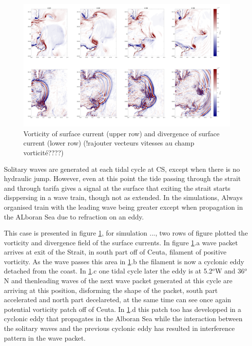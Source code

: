 \begin{figure}[!h]
 \centering
\includegraphics[width=\linewidth]{./GBR3D/FigTourbVE2.png}
 \caption {Vorticity of surface current (upper row) and divergence of surface current (lower row)  (!rajouter vecteurs vitesses au champ vorticité????)}
 \label{FigeddGBR3D}
\end{figure}

Solitary waves are generated at each tidal cycle at CS, except when there is no hydraulic jump. However, even at this point the tide passing through the strait and through tarifa gives a signal at the surface that exiting the strait starts disppersing in a wave train, though not as extended. In the simulations, Always organised train with the leading wave being greater except when propagation in the ALboran Sea due to refraction on an eddy.

This case is presented in figure \ref{FigeddGBR3D}, for simulation ...,  two rows of figure plotted the vorticity and divergence field of the surface currents. In figure \ref{FigeddGBR3D}.a wave packet arrives at exit of the Strait, in south part off of Ceuta, filament of positive vorticity. As the wave passes this area in \ref{FigeddGBR3D}.b the filament is now a cyclonic eddy detached from the coast. In \ref{FigeddGBR3D}.c one tidal cycle later the eddy is at 5.2$^o$W and 36$^o$N and thenleading waves of the next wave packet generated at this cycle are arriving at this position, disforming the shape of the packet, south part accelerated and north part decelareted, at the same time can see once again potential vorticity patch off of Ceuta. In \ref{FigeddGBR3D}.d this patch too has developped in a cyclonic eddy that propagates in the Alboran Sea while the interaction between the solitary waves and the previous cyclonic eddy has resulted in interference pattern in the wave packet. 

